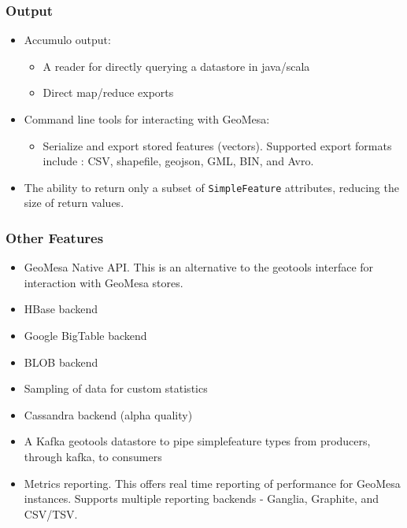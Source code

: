 \subsubsection*{Output}

\begin{itemize}
\item{
  Accumulo output:
  \begin{itemize}
  \item A reader for directly querying a datastore in java/scala
  \item Direct map/reduce exports
  \end{itemize}
}
\item{
  Command line tools for interacting with GeoMesa:
  \begin{itemize}
  \item Serialize and export stored features (vectors).  Supported export formats include : CSV, shapefile, geojson, GML, BIN, and Avro.
  \end{itemize}
}
\item The ability to return only a subset of \texttt{SimpleFeature} attributes, reducing the size of return values.
\end{itemize}


\subsubsection*{Other Features}

\begin{itemize}
\item{
  GeoMesa Native API.
  This is an alternative to the geotools interface for interaction with GeoMesa stores.
}
\item HBase backend
\item Google BigTable backend
\item BLOB backend
\item Sampling of data for custom statistics
\item Cassandra backend (alpha quality)
\item A Kafka geotools datastore to pipe simplefeature types from producers, through kafka, to consumers
\item{
  Metrics reporting.
  This offers real time reporting of performance for GeoMesa instances.
  Supports multiple reporting backends - Ganglia, Graphite, and CSV/TSV.
}
\end{itemize}
